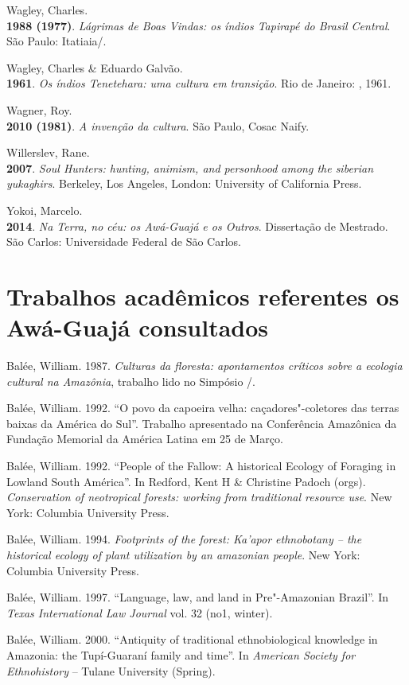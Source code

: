 \begin{Parskip}
Wagley, Charles.\\
\textbf{1988 (1977)}. \emph{Lágrimas de Boas Vindas: os índios Tapirapé
do Brasil Central}. São Paulo: Itatiaia/.

Wagley, Charles \& Eduardo Galvão.\\
\textbf{1961}. \emph{Os índios Tenetehara: uma cultura em transição}.
Rio de Janeiro: , 1961.

Wagner, Roy.\\
\textbf{2010 (1981)}. \emph{A invenção da cultura}. São Paulo, Cosac
Naify.

Willerslev, Rane.\\
\textbf{2007}. \emph{Soul Hunters: hunting, animism, and personhood
among the siberian yukaghirs}. Berkeley, Los Angeles, London: University
of California Press.

Yokoi, Marcelo.\\
\textbf{2014}. \emph{Na Terra, no céu: os Awá-Guajá e os Outros}.
Dissertação de Mestrado. São Carlos: Universidade Federal de São Carlos.

\section{Trabalhos acadêmicos referentes os Awá-Guajá consultados}

Balée, William. 1987. \emph{Culturas da floresta: apontamentos críticos
sobre a ecologia cultural na Amazônia}, trabalho lido no Simpósio
/.

Balée, William. 1992. ``O povo da capoeira velha: caçadores"-coletores
das terras baixas da América do Sul''. Trabalho apresentado na
Conferência Amazônica da Fundação Memorial da América Latina em 25 de
Março.

Balée, William. 1992. ``People of the Fallow: A historical Ecology of
Foraging in Lowland South América''. In Redford, Kent H \& Christine
Padoch (orgs). \emph{Conservation of neotropical forests: working from
traditional resource use}. New York: Columbia University Press.

Balée, William. 1994. \emph{Footprints of the forest: Ka'apor
ethnobotany -- the historical ecology of plant utilization by an
amazonian people}. New York: Columbia University Press.

Balée, William. 1997. ``Language, law, and land in Pre"-Amazonian
Brazil''. In \emph{Texas International Law Journal} vol. 32 (no1,
winter).

Balée, William. 2000. ``Antiquity of traditional ethnobiological
knowledge in Amazonia: the Tupí-Guaraní family and time''. In
\emph{American Society for Ethnohistory} -- Tulane University (Spring).


\end{Parskip}
